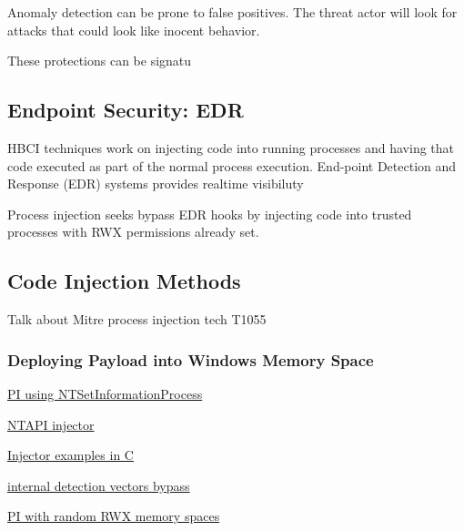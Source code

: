 Anomaly detection can be prone to false positives.  The threat actor will look for attacks that could look like inocent behavior.

These protections can be signatu



\subsection{Endpoint Security: EDR}

HBCI techniques work on injecting code into running processes and having that code executed as part of the normal process
execution.  End-point Detection and Response (EDR) systems \autocite{Hayes:2023} provides realtime visibiluty

Process injection seeks bypass EDR hooks by injecting code into trusted processes with RWX permissions already set.

\subsection{Code Injection Methods}

Talk about Mitre process injection tech T1055 \autocite{Mitre:2017}

\subsubsection{Deploying Payload into Windows Memory Space}


\autocite{Zhan:2018}

\href{https://www.riskinsight-wavestone.com/en/2023/10/process-injection-using-ntsetinformationprocess/}{PI using NTSetInformationProcess}

\href{https://github.com/elddy/Windows-NTAPI-Injector}{NTAPI injector} 

\href{https://gist.github.com/WKL-Sec/96e17188e4c159c2cdf7ff2c111130cc#file-local-c}{Injector examples in C}

\href{https://www.unknowncheats.me/forum/anti-cheat-bypass/286274-internal-detection-vectors-bypass.html}{internal detection vectors bypass}

\href{https://medium.com/@s12deff/process-injection-with-random-rwx-memory-spaces-3e3651149527}{PI with random RWX memory spaces}
